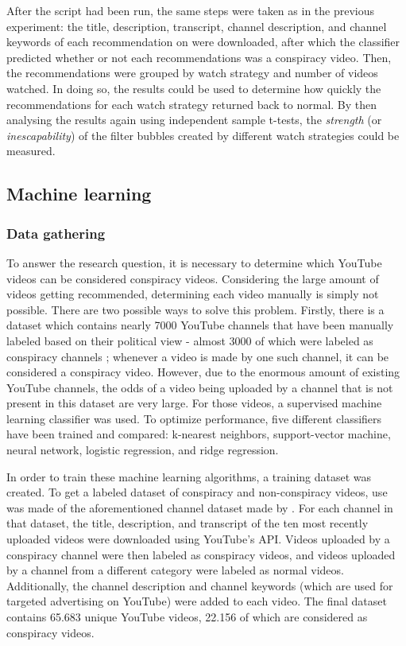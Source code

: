 \documentclass[../main.tex]{subfiles}
\begin{document}
\vspace{0.25in}

\linenumbers

\noindent After the script had been run, the same steps were taken as in the previous experiment: the 
title, description, transcript, channel description, and channel keywords of each recommendation
on were downloaded, after which the classifier predicted whether or not each recommendations was a 
conspiracy video. Then, the recommendations were grouped by watch strategy and number of videos watched. In
doing so, the results could be used to determine how quickly the recommendations for each watch strategy 
returned back to normal. By then analysing the results again using independent sample t-tests, the 
\textit{strength} (or \textit{inescapability}) of the filter bubbles created by different watch strategies 
could be measured.

\subsection{Machine learning} \label{Machine Learning}
\subsubsection{Data gathering}
To answer the research question, it is necessary to determine which YouTube videos can be considered
conspiracy videos. Considering the large amount of videos getting recommended, determining each video
manually is simply not possible. There are two possible ways to solve this problem. Firstly, there is a
dataset which contains nearly 7000 YouTube channels that have been manually labeled based on their
political view - almost 3000 of which were labeled as conspiracy channels \citep{ledwich2019algorithmic};
whenever a video is made by one such channel, it can be considered a conspiracy video. However, due to
the enormous amount of existing YouTube channels, the odds of a video being uploaded by a channel that
is not present in this dataset are very large. For those videos, a supervised machine learning
classifier was used. To optimize performance, five different classifiers have been trained and compared:
k-nearest neighbors, support-vector machine, neural network, logistic regression, and ridge regression. 

In order to train these machine learning algorithms, a training dataset was created. To get a labeled
dataset of conspiracy and non-conspiracy videos, use was made of the aforementioned channel dataset made
by \citet{ledwich2019algorithmic}. For each channel in that dataset, the title, description, and
transcript of the ten most recently uploaded videos were downloaded using YouTube's API. Videos uploaded
by a conspiracy channel were then labeled as conspiracy videos, and videos uploaded by a channel from a
different category were labeled as normal videos. Additionally, the channel description and channel
keywords (which are used for targeted advertising on YouTube) were added to each video. The final
dataset contains 65.683 unique YouTube videos, 22.156 of which are considered as conspiracy videos. 
\end{document}
